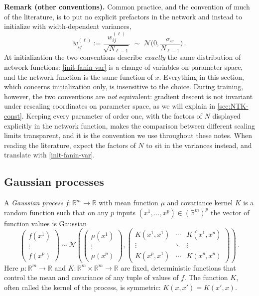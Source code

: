 \documentclass[11pt]{article}
\newcommand{\R}{\mathbb{R}}
\newcommand{\CN}{{\mathcal N}}
\begin{document}
\smallskip
\noindent\textbf{Remark (other conventions).} Common practice, and the convention of much of the literature, is to put no explicit prefactors in the network and instead to initialize with width-dependent variances,
%
\begin{equation} \label{init-fanin-var}
    \tilde w^{(\ell)}_{ij} := \frac{w^{(\ell)}_{ij}}{\sqrt{N_{\ell-1}}} \;\sim\; \CN\Big(0,\frac{\sigma_w}{N_{\ell-1}}\Big)\,.
\end{equation}
%
At initialization the two conventions describe \emph{exactly} the same distribution of network functions: \eqref{init-fanin-var} is a change of variables on parameter space, and the network function is the same function of $x$. Everything in this section, which concerns initialization only, is insensitive to the choice. During training, however, the two conventions are \emph{not} equivalent: gradient descent is not invariant under rescaling coordinates on parameter space, as we will explain in \cref{sec:NTK-const}. Keeping every parameter of order one, with the factors of $N$ displayed explicitly in the network function, makes the comparison between different scaling limits transparent, and it is the convention we use throughout these notes. When reading the literature, expect the factors of $N$ to sit in the variances instead, and translate with \eqref{init-fanin-var}.

\subsection{Gaussian processes}
\label{sec:GP}


A \emph{Gaussian process} $f:\R^m\to \R$ with mean function $\mu$ and covariance kernel $K$ is a random function such that on any $p$ inputs $(x^1,...,x^p)\in (\R^m)^p$ the vector of function values is Gaussian
%
\begin{equation} \begin{pmatrix} f(x^1) \\ \vdots \\ f(x^p) \end{pmatrix} \sim \CN \left( \begin{pmatrix} \mu(x^1) \\ \vdots \\ \mu(x^p) \end{pmatrix}, \begin{pmatrix} K(x^1,x^1) & \cdots & K(x^1,x^p) \\ \vdots & \ddots & \vdots \\ K(x^p,x^1) & \cdots & K(x^p,x^p) \end{pmatrix} \right)\,.  \end{equation}
%
Here $\mu:\R^m\to \R$ and $K:\R^m\times \R^m\to \R$ are fixed, deterministic functions that control the mean and covariance of any tuple of values of $f$. The function $K$, often called the kernel of the process, is symmetric: $K(x,x')=K(x',x)$.
\end{document}
